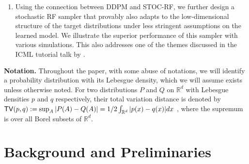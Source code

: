 \documentclass{article}
\theoremstyle{plain}
\theoremstyle{definition}
\theoremstyle{remark}
\def\supp{{\sf supp}}
\def\TV{{\sf TV}}
\newcommand{\Law}{\text{Law}}
\begin{document}
\begin{enumerate}
 \item Using the connection between DDPM and STOC-RF, we further design a stochastic RF sampler that provably also adapts to the low-dimensional structure of the target distributions under less stringent assumptions on the learned model. We illustrate the superior performance of this sampler with various simulations. This also addresses one of the themes discussed in the ICML tutorial talk by \citet{liu2025flowing}.
\end{enumerate}
\textbf{Notation.} {Throughout the paper, with some abuse of notations, we will identify  a probability distribution with its Lebesgue density, which we will assume exists unless otherwise noted.} 
For two  distributions $P$ and $Q$ on $\mathbb{R}^d$ with Lebesgue densities $p$ and $q$ respectively, their total variation distance is denoted by $\TV(p,q):= \sup_{A} \vert{P(A) - Q(A)}\vert = 1/2 \int_{\mathbb{R}^d} |p(x) - q(x)| dx $ , where the supremum is over all Borel subsets of $\mathbb{R}^d$.

\section{Background and Preliminaries}
\label{sec: background}
\end{document}
